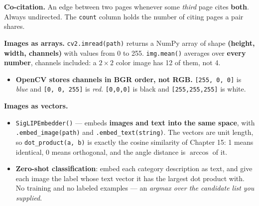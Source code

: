 \documentclass[11pt, a4paper]{article}
\newcommand{\code}[1]{\texttt{#1}}
\begin{document}
\smallskip

\textbf{Co-citation.}
An edge between two pages whenever some \textit{third} page cites \textbf{both}. Always
undirected. The \code{count} column holds the number of citing pages a pair shares.

\smallskip

\textbf{Images as arrays.}
\code{cv2.imread(path)} returns a NumPy array of shape \textbf{(height, width, channels)} with
values from 0 to 255. \code{img.mean()} averages over \textbf{every number}, channels included:
a $2 \times 2$ color image has 12 of them, not 4.

\begin{itemize}
  \item \textbf{OpenCV stores channels in BGR order, not RGB.} \code{[255, 0, 0]} is
        \textit{blue} and \code{[0, 0, 255]} is \textit{red}. \code{[0,0,0]} is black and
        \code{[255,255,255]} is white.
\end{itemize}

\smallskip

\textbf{Images as vectors.}

\begin{itemize}
  \item \code{SigLIPEmbedder()} --- embeds \textbf{images and text into the same space}, with
        \code{.embed\_image(path)} and \code{.embed\_text(string)}. The vectors are unit length,
        so \code{dot\_product(a, b)} is exactly the cosine similarity of Chapter 15: 1 means
        identical, 0 means orthogonal, and the angle distance is $\arccos$ of it.
  \item \textbf{Zero-shot classification}: embed each category description as text, and give
        each image the label whose text vector it has the largest dot product with. No training
        and no labeled examples --- an \textit{argmax over the candidate list you supplied}.
\end{itemize}
\end{document}
